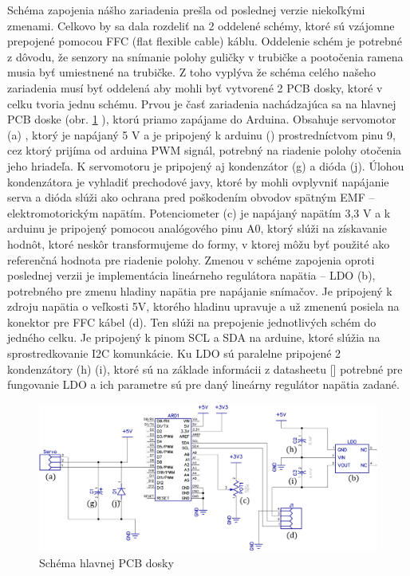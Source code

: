 Schéma zapojenia nášho zariadenia prešla od poslednej verzie niekoľkými zmenami. Celkovo by sa dala rozdeliť na 2 oddelené schémy, ktoré sú vzájomne prepojené pomocou FFC (flat flexible cable) káblu. Oddelenie schém je potrebné z dôvodu, že senzory na snímanie polohy guličky v trubičke a pootočenia ramena musia byť umiestnené na trubičke. Z toho vyplýva že schéma celého našeho zariadenia musí byť oddelená aby mohli byť vytvorené 2 PCB dosky, ktoré v celku tvoria jednu schému. Prvou je časť zariadenia nachádzajúca sa na hlavnej PCB doske (obr. \ref{OBRAZOK 2.1.1} ), ktorú priamo zapájame do Arduina. Obsahuje servomotor (a) , ktorý je napájaný 5 V a je pripojený k arduinu () prostredníctvom pinu 9, cez ktorý prijíma od arduina PWM signál, potrebný na riadenie polohy otočenia jeho hriadeľa. K servomotoru je pripojený aj kondenzátor (g) a dióda (j). Úlohou kondenzátora je vyhladiť prechodové javy, ktoré by mohli ovplyvniť napájanie serva a dióda slúži ako ochrana pred poškodením obvodov spätným EMF – elektromotorickým napätím. Potenciometer (c) je napájaný napätím 3,3 V a k arduinu je pripojený pomocou analógového pinu A0, ktorý slúži na získavanie hodnôt, ktoré neskôr transformujeme do formy, v ktorej môžu byť použité ako referenčná hodnota pre riadenie polohy.  Zmenou v schéme zapojenia oproti poslednej verzii je implementácia lineárneho regulátora napätia – LDO (b), potrebného pre zmenu hladiny napätia pre napájanie snímačov. Je pripojený k zdroju napätia o veľkosti 5V, ktorého hladinu upravuje a už zmenenú posiela na konektor pre FFC kábel (d). Ten slúži na prepojenie jednotlivých schém do jedného celku. Je pripojený k pinom SCL a SDA na arduine, ktoré slúžia na sprostredkovanie I2C komunkácie. Ku LDO sú paralelne pripojené 2 kondenzátory (h) (i), ktoré sú na základe informácii z datasheetu [] potrebné pre fungovanie LDO a ich parametre sú pre daný lineárny regulátor napätia zadané. 
\begin{figure}[]
	\centering
	\includegraphics[width=150mm]{obr/BoBshield.eps}
	\caption{Schéma hlavnej PCB dosky}\label{OBRAZOK 2.1.1} 
\end{figure} 

